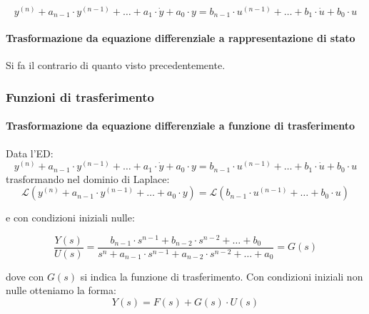 \documentclass[11pt]{article}
\begin{document}
\begin{equation}
y^{(n)} + a_{n-1} \cdot y^{(n-1)} + \dots + a_1 \cdot \dot{y} + a_0 \cdot y = b_{n-1} \cdot u^{(n-1)} + \dots + b_1 \cdot \dot{u} + b_0 \cdot u
\end{equation}

    \hypertarget{trasformazione-da-equazione-differenziale-a-rappresentazione-di-stato}{%
\paragraph{Trasformazione da equazione differenziale a rappresentazione
di
stato}\label{trasformazione-da-equazione-differenziale-a-rappresentazione-di-stato}}

Si fa il contrario di quanto visto precedentemente.

    \hypertarget{funzioni-di-trasferimento}{%
\subsubsection{Funzioni di
trasferimento}\label{funzioni-di-trasferimento}}

\hypertarget{trasformazione-da-equazione-differenziale-a-funzione-di-trasferimento}{%
\paragraph{Trasformazione da equazione differenziale a funzione di
trasferimento}\label{trasformazione-da-equazione-differenziale-a-funzione-di-trasferimento}}

Data l'ED: \begin{equation}
y^{(n)} + a_{n-1} \cdot y^{(n-1)} + \dots + a_1 \cdot \dot{y} + a_0 \cdot y = b_{n-1} \cdot u^{(n-1)} + \dots + b_1 \cdot \dot{u} + b_0 \cdot u
\end{equation} trasformando nel dominio di Laplace: \begin{equation}
    \mathcal{L}(y^{(n)} + a_{n-1} \cdot y^{(n-1)} + \dots + a_0 \cdot y) = \mathcal{L}(b_{n-1} \cdot u^{(n-1)} + \dots + b_0 \cdot u)
\end{equation}

    e con condizioni iniziali nulle:

\begin{equation}
    \frac{Y(s)}{U(s)} = \frac{b_{n-1} \cdot s^{n-1} + b_{n-2} \cdot s^{n-2}  + \dots + b_0}{s^n + a_{n-1} \cdot s^{n-1} + a_{n-2} \cdot s^{n-2} + \dots + a_0} = G(s)
\end{equation}

    dove con \(G(s)\) si indica la funzione di trasferimento. Con condizioni
iniziali non nulle otteniamo la forma:\\
\begin{equation}
  Y(s) = F(s) + G(s) \cdot U(s)
\end{equation}
\end{document}
